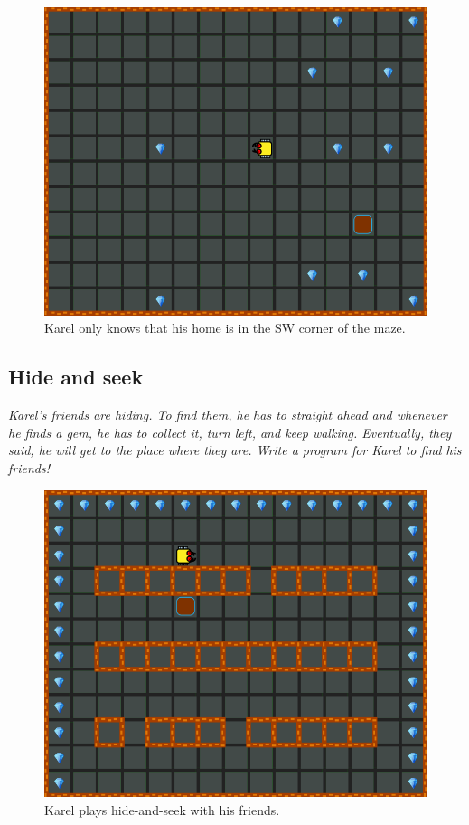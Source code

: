 \begin{figure}[!ht]
\begin{center}
\includegraphics[height=0.4\textwidth]{img/e01.png}
\end{center}
\vspace{-4mm}
\caption{Karel only knows that his home is in the SW corner of the maze.}
\label{fig:e01}
\vspace{-10mm}
\end{figure}
\newpage


\subsection{Hide and seek}

{\em Karel's friends are hiding. To find them, he has to straight ahead 
and whenever he finds a gem, he has to collect it, 
turn left, and keep walking. Eventually, they said, he will get to the place 
where they are. Write a program for Karel to find his friends!}\\[-7mm]


\begin{figure}[!ht]
\begin{center}
\includegraphics[height=0.4\textwidth]{img/e02.png}
\end{center}
\vspace{-4mm}
\caption{Karel plays hide-and-seek with his friends.}
\label{fig:e02}
\end{figure}
\vspace{-10mm}


